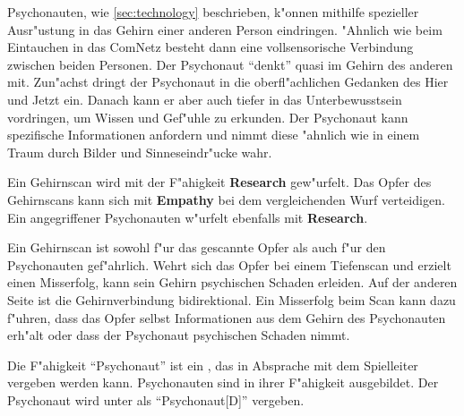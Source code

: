Psychonauten, wie \cref{sec:technology} beschrieben, k"onnen mithilfe spezieller Ausr"ustung in das Gehirn einer anderen Person eindringen. "Ahnlich wie beim Eintauchen in das ComNetz besteht dann eine vollsensorische Verbindung zwischen beiden Personen. Der Psychonaut ``denkt'' quasi im Gehirn des anderen mit. Zun"achst dringt der Psychonaut in die oberfl"achlichen Gedanken des Hier und Jetzt ein. Danach kann er aber auch tiefer in das Unterbewusstsein vordringen, um Wissen und Gef"uhle zu erkunden. Der Psychonaut kann spezifische Informationen anfordern und nimmt diese "ahnlich wie in einem Traum durch Bilder und Sinneseindr"ucke wahr.

Ein Gehirnscan wird mit der F"ahigkeit \textbf{Research} gew"urfelt. Das Opfer des Gehirnscans kann sich mit \textbf{Empathy} bei dem vergleichenden Wurf verteidigen. Ein angegriffener Psychonauten w"urfelt ebenfalls mit \textbf{Research}.

Ein Gehirnscan ist sowohl f"ur das gescannte Opfer als auch f"ur den Psychonauten gef"ahrlich. Wehrt sich das Opfer bei einem Tiefenscan und erzielt einen Misserfolg, kann sein Gehirn psychischen Schaden erleiden. Auf der anderen Seite ist die Gehirnverbindung bidirektional. Ein Misserfolg beim Scan kann dazu f"uhren, dass das Opfer selbst Informationen aus dem Gehirn des Psychonauten erh"alt oder dass der Psychonaut psychischen Schaden nimmt.

Die F"ahigkeit ``Psychonaut'' ist ein , das in Absprache mit dem Spielleiter vergeben werden kann. Psychonauten sind in ihrer F"ahigkeit ausgebildet. Der Psychonaut wird unter  als ``Psychonaut[D]'' vergeben.

